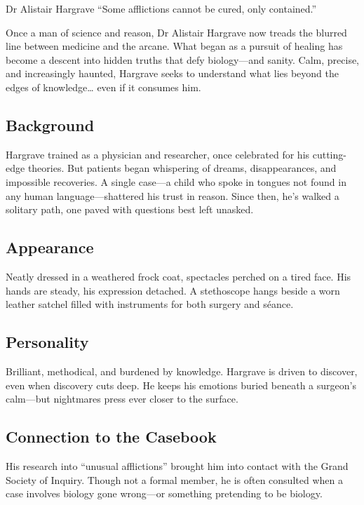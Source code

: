 \begin{WyrdCharacterSheet}
    {Dr Alistair Hargrave} 
    {“Some afflictions cannot be cured, only contained.”}
    \label{pc:alistair-hargrave}

    Once a man of science and reason, Dr Alistair Hargrave now treads the blurred line between medicine and the arcane. What began as a pursuit of healing has become a descent into hidden truths that defy biology—and sanity. Calm, precise, and increasingly haunted, Hargrave seeks to understand what lies beyond the edges of knowledge… even if it consumes him.

    \subsection{Background}
    Hargrave trained as a physician and researcher, once celebrated for his cutting-edge theories. But patients began whispering of dreams, disappearances, and impossible recoveries. A single case—a child who spoke in tongues not found in any human language—shattered his trust in reason. Since then, he’s walked a solitary path, one paved with questions best left unasked.

    \subsection{Appearance}
    Neatly dressed in a weathered frock coat, spectacles perched on a tired face. His hands are steady, his expression detached. A stethoscope hangs beside a worn leather satchel filled with instruments for both surgery and séance.

    \subsection{Personality}
    Brilliant, methodical, and burdened by knowledge. Hargrave is driven to discover, even when discovery cuts deep. He keeps his emotions buried beneath a surgeon’s calm—but nightmares press ever closer to the surface.

    \subsection{Connection to the Casebook}
    His research into “unusual afflictions” brought him into contact with the Grand Society of Inquiry. Though not a formal member, he is often consulted when a case involves biology gone wrong—or something pretending to be biology.


\end{WyrdCharacterSheet}

